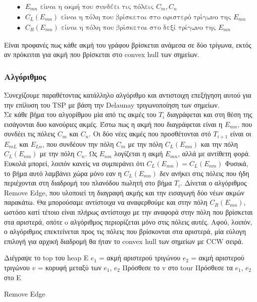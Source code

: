 \documentclass[oneside,12pt]{book}
\theoremstyle{definition}
\begin{document}
\begin{align*}
	& \bullet \text{ } E_{mn} \text{ είναι η ακμή που συνδέει τις πόλεις } C_m, C_n \\
	& \bullet \text{ } C_L(E_{mn}) \text{ είναι η πόλη που βρίσκεται στο αριστερό τρίγωνο της } E_{mn} \\
	& \bullet \text{ } C_R(E_{mn}) \text{ είναι η πόλη που βρίσκεται στο δεξί τρίγωνο της } E_{mn}
\end{align*}

Είναι προφανές πως κάθε ακμή του γράφου βρίσκεται ανάμεσα σε δύο τρίγωνα, εκτός αν πρόκειται για ακμή που βρίσκεται στο convex hull των σημείων. \\

\subsubsection{Αλγόριθμος}

Συνεχίζουμε παραθέτοντας κατάλληλο αλγόριθμο και αντιστοιχη επεξήγηση αυτού για την επίλυση του TSP με βάση την Delaunay τριγωνοποίηση των σημείων. \\

Σε κάθε βήμα του αλγορίθμου μία από τις ακμές του \(T_i\) διαγράφεται και στη θέση της εισάγονται δυο κανούριες ακμές. Έστω πως η ακμή που διαγράφεται είναι η \(E_{mn}\), που συνδέει τις πόλεις \(C_m\) και \(C_n\). Οι δύο νέες ακμές που προσθέτονται στό \(Τ_{i+1}\) είναι οι \(E_{mL}\) και \(E_{Ln}\), που συνδέουν την πόλη \(C_m\) με την πόλη \(C_L(E_{mn})\) και την πόλη \(C_L(E_{nm})\) με την πόλη \(C_n\). Ως \(E_{nm}\) λογίζεται η ακμή \(E_{mn}\), αλλά με αντίθετη φορά. Ευκολά μπορεί, λοιπόν κανείς να συμπεράνει ότι \(C_L(E_{mn}) = C_L(E_{nm})\) Φυσικά, το βήμα αυτό λαμβάνει χώρα μόνο εαν η \(C_L(E_{mn})\) δεν ανήκει στις πόλεις που ήδη περιέχονται στη διαδρομή του πλανόδου πωλητή στο βήμα \(T_i\). Δίνεται ο αλγόριθμος Remove Edge, που υλοποιεί τη διαγραφή ακμής και την εισαγωγή δύο νέων ακμών παρακάτω. Θα μπορούσαμε αντίστοιχα να αναφερθούμε και στην πόλη \(C_R(E_{mn})\), ωστόσο κατί τέτοιο είναι πλήρως αντίστοιχο με την αναφορά στην πόλη που βρίσκεται στα αριστερά, οπότε o αλγόριθμος περιορίζεται μόνο στις πόλεις αυτές. Αφού, λοιπόν, ο αλγόριθμος επεκτείνεται προς τις πόλεις που βρίσκονται στα αριστερά, μία εύλογη επιλογή για αρχική διαδρομή θα ήταν το convex hull των σημείων με CCW σειρά. \\

\begin{algorithm}[H]
	\SetAlgoLined

	Διέγραψε το top του heap Ε \;
	\(e_1\) = ακμή αριστερού τριγώνου \;
	\(e_2\) = ακμή αριστερού τριγώνου \;
	\(v\) = κορυφή μεταξύ των \(e_1\), \(e_2\) \;
	Πρόσθεσε το v στο tour \;
	Πρόσθεσε τα \(e_1\), \(e_2\) στο Ε \;

	\caption{Remove Edge}
\end{algorithm}
\end{document}
